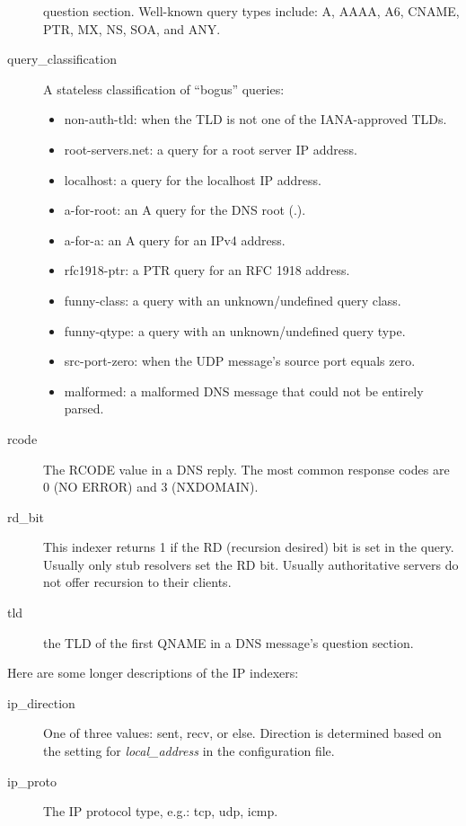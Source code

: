 \documentclass{report}
\begin{document}
\begin{description}
	question section.  Well-known query types include: A, AAAA,
	A6, CNAME, PTR, MX, NS, SOA, and ANY.
\item[query\_classification]
	A stateless classification of ``bogus'' queries:
	\begin{itemize}
	\setlength{\itemsep}{0ex plus 0.5ex minus 0.0ex}
	\item non-auth-tld: when the TLD is not one of the IANA-approved TLDs.
	\item root-servers.net: a query for a root server IP address.
	\item localhost: a query for the localhost IP address.
	\item a-for-root: an A query for the DNS root (.).
	\item a-for-a: an A query for an IPv4 address.
	\item rfc1918-ptr: a PTR query for an RFC 1918 address.
	\item funny-class: a query with an unknown/undefined query class.
	\item funny-qtype: a query with an unknown/undefined query type.
	\item src-port-zero: when the UDP message's source port equals zero.
	\item malformed: a malformed DNS message that could not be entirely parsed.
	\end{itemize}
\item[rcode]
	The RCODE value in a DNS reply.  The most common response
	codes are 0 (NO ERROR) and 3 (NXDOMAIN). 
\item[rd\_bit]
	This indexer returns 1 if the RD (recursion desired) bit is
	set in the query.  Usually only stub resolvers set the RD bit.
	Usually authoritative servers do not offer recursion to their
	clients.
\item[tld]
	the TLD of the first QNAME in a DNS message's question section.
\end{description}

\noindent
Here are some longer descriptions of the IP indexers:

\begin{description}
\item[ip\_direction]
	One of three values: sent, recv, or else.  Direction is determined
	based on the setting for {\em local\_address\/} in the configuration file.
\item[ip\_proto]
	The IP protocol type, e.g.: tcp, udp, icmp.
\end{description}
\end{document}
